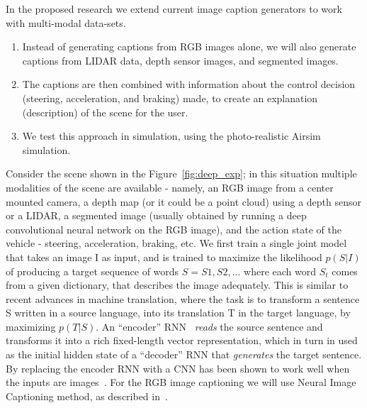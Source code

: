 In the proposed research we extend current image caption generators to work with multi-modal data-sets.
\begin{enumerate}[itemsep=0pt,parsep=0pt,topsep=4pt,leftmargin=0.4in]
    \item Instead of generating captions from RGB images alone, we will also generate captions from LIDAR data, depth sensor images, and segmented images. 
    \item The captions are then combined with information about the control decision (steering, acceleration, and braking) made, to create an explanation (description) of the scene for the user. 
    \item We test this approach in simulation, using the photo-realistic Airsim~\cite{shah2018airsim} simulation. 
\end{enumerate}
Consider the scene shown in the Figure~\ref{fig:deep_exp}; in this situation multiple modalities of the scene are available - namely, an RGB image from a center mounted camera, a depth map (or it could be a point cloud) using a depth sensor or a LIDAR, a segmented image (usually obtained by running a deep convolutional neural network on the RGB image), and the action state of the vehicle - steering, acceleration, braking, etc. 
We first train a single joint model that takes an image I as input, and is trained to maximize the likelihood $p(S|I)$ of producing a target sequence of words $S = {S1, S2, . . .}$ where each word $S_t$ comes from a given dictionary, that describes the image adequately.
This is similar to recent advances in machine translation, where the task is to transform a sentence S written in a source language, into its translation T in the target language, by maximizing $p(T|S)$. 
An ``encoder'' RNN~\cite{cho2014learning, bahdanau2014neural, sutskever2014sequence} \textit{reads} the source sentence and transforms it into a rich fixed-length vector representation, which in turn in used as the initial hidden state of a ``decoder'' RNN that \textit{generates} the target sentence. By replacing the encoder RNN with a CNN has been shown to work well when the inputs are images~\cite{sermanet2013overfeat}. 
For the RGB image captioning we will use Neural Image Captioning method, as described in~\cite{Vinyals2015ShowAT}.

